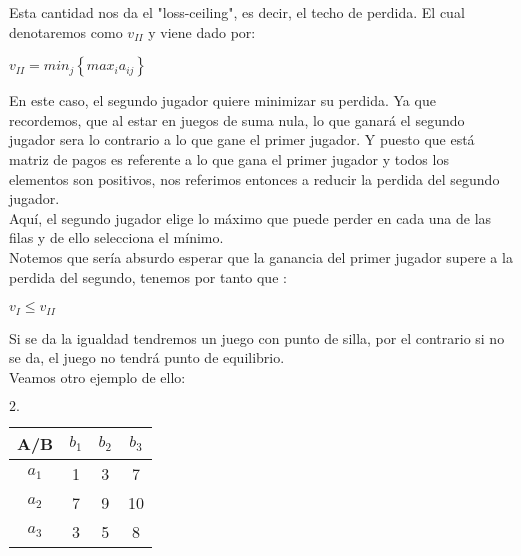 \documentclass[10pt,a4paper]{book}
\begin{document}
Esta cantidad nos da el "loss-ceiling", es decir, el techo de perdida. El cual denotaremos como $v_{II}$ y viene dado por:\\

\begin{center}

$v_{II}= min_j \left\lbrace max_i a_{ij} \right\rbrace $

\end{center}

En este caso, el segundo jugador quiere minimizar su perdida. Ya que recordemos, que al estar en juegos de suma nula, lo que ganará el segundo jugador sera lo contrario a lo que gane el primer jugador. Y puesto que está matriz de pagos es referente a lo que gana el primer jugador y todos los elementos son positivos, nos referimos entonces a reducir la perdida del segundo jugador.\\

Aquí, el segundo jugador elige lo máximo que puede perder en cada una de las filas y de ello selecciona el mínimo.\\

Notemos que sería absurdo esperar que la ganancia del primer jugador supere a la perdida del segundo, tenemos por tanto que :\\

\begin{center}

$v_I \leq v_{II}$

\end{center}


Si se da la igualdad tendremos un juego con punto de silla, por el contrario si no se da, el juego no tendrá punto de equilibrio.\\

Veamos otro ejemplo de ello:\\

\begin{center}
		$2. \quad$
	\begin{tabular}{|c|c|c|c|}
		\hline
		A/B & $b_1$ & $b_2$ & $b_3$ \\
		\hline
		$a_1$ & 1 & 3 & 7 \\
		\hline
		$a_2$ & 7 & 9 & 10 \\
		\hline
		$a_3$ & 3 & 5 & 8 \\
		\hline
	\end{tabular}
\end{center}
\end{document}
